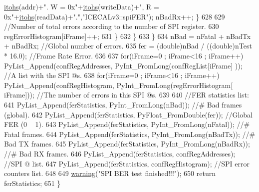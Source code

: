 \begin{DoxyCode}
      \hyperlink{classICECALv3_a04b02e583f191bfce34d05132cd23834}{itohs}(addr)+\textcolor{stringliteral}{".  W = 0x"}+\hyperlink{classICECALv3_a04b02e583f191bfce34d05132cd23834}{itohs}(writeData)+\textcolor{stringliteral}{", R = 0x"}+\hyperlink{classICECALv3_a04b02e583f191bfce34d05132cd23834}{itohs}(readData)+\textcolor{stringliteral}{"."},\textcolor{stringliteral}{"ICECALv3::spiFER"});     
      nBadRx++;    \}
628 
629                 \textcolor{comment}{//Number of total errors according to the number of SPI register.}
630                 regErrorHistogram[iFrame]++;
631             \}
632         \}
633     \}
634     nBad = nFatal + nBadTx + nBadRx;                            \textcolor{comment}{//Global number of errors.}
635     fer = (double)nBad / ((\textcolor{keywordtype}{double})nTest * 16.0);    \textcolor{comment}{//Frame Rate Error.}
636 
637     \textcolor{keywordflow}{for}(iFrame=0 ; iFrame<16 ; iFrame++) PyList\_Append(confRegAddresses, PyInt\_FromLong(confRegList[iFrame]
      ));              \textcolor{comment}{//A list with the SPI @s.}
638     \textcolor{keywordflow}{for}(iFrame=0 ; iFrame<16 ; iFrame++) PyList\_Append(confRegHistogram, PyInt\_FromLong(regErrorHistogram[
      iFrame]));    \textcolor{comment}{//The number of errors in this SPI @s.}
639 
640     \textcolor{comment}{//FER statistics list:}
641     PyList\_Append(ferStatistics, PyInt\_FromLong(nBad));         \textcolor{comment}{//# Bad frames (global).}
642     PyList\_Append(ferStatistics, PyFloat\_FromDouble(fer));  \textcolor{comment}{//Global FER (0 ~ 1).}
643     PyList\_Append(ferStatistics, PyInt\_FromLong(nFatal));       \textcolor{comment}{//# Fatal frames.}
644     PyList\_Append(ferStatistics, PyInt\_FromLong(nBadTx));       \textcolor{comment}{//# Bad TX frames.}
645     PyList\_Append(ferStatistics, PyInt\_FromLong(nBadRx));       \textcolor{comment}{//# Bad RX frames.}
646     PyList\_Append(ferStatistics, confRegAddresses);                 \textcolor{comment}{//SPI @ list.}
647     PyList\_Append(ferStatistics, confRegHistogram);                 \textcolor{comment}{//SPI error counters list.}
648 
649     \hyperlink{classObject_a65cd4fda577711660821fd2cd5a3b4c9}{warning}(\textcolor{stringliteral}{"SPI BER test finished!!!"});
650     \textcolor{keywordflow}{return} ferStatistics;
651 \}
\end{DoxyCode}
\mbox{\label{classICECALv3_aaabb9543482c4141fa89b4b8410164e0}} 

